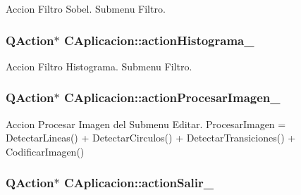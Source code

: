 Accion Filtro Sobel. Submenu Filtro. 

\subsubsection[{\texorpdfstring{action\+Histograma\+\_\+}{actionHistograma_}}]{\setlength{\rightskip}{0pt plus 5cm}Q\+Action$\ast$ C\+Aplicacion\+::action\+Histograma\+\_\+\hspace{0.3cm}{\ttfamily [private]}}\hypertarget{classCAplicacion_a60f0707037ad02949ff17858729faff2}{}\label{classCAplicacion_a60f0707037ad02949ff17858729faff2}


Accion Filtro Histograma. Submenu Filtro. 

\subsubsection[{\texorpdfstring{action\+Procesar\+Imagen\+\_\+}{actionProcesarImagen_}}]{\setlength{\rightskip}{0pt plus 5cm}Q\+Action$\ast$ C\+Aplicacion\+::action\+Procesar\+Imagen\+\_\+\hspace{0.3cm}{\ttfamily [private]}}\hypertarget{classCAplicacion_a9fa952c19f9da356432fae60a40cdced}{}\label{classCAplicacion_a9fa952c19f9da356432fae60a40cdced}


Accion Procesar Imagen del Submenu Editar. Procesar\+Imagen = Detectar\+Lineas() + Detectar\+Circulos() + Detectar\+Transiciones() + Codificar\+Imagen() 

\subsubsection[{\texorpdfstring{action\+Salir\+\_\+}{actionSalir_}}]{\setlength{\rightskip}{0pt plus 5cm}Q\+Action$\ast$ C\+Aplicacion\+::action\+Salir\+\_\+\hspace{0.3cm}{\ttfamily [private]}}\hypertarget{classCAplicacion_ac878000751c05f9491a9de6671e6cde0}{}\label{classCAplicacion_ac878000751c05f9491a9de6671e6cde0}


